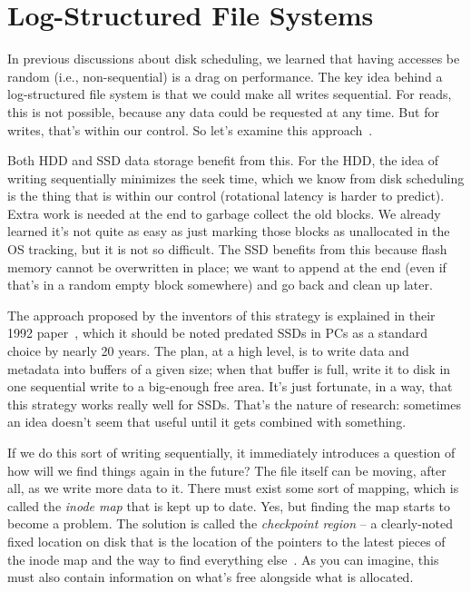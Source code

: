 




\section*{Log-Structured File Systems}
In previous discussions about disk scheduling, we learned that having accesses be random (i.e., non-sequential) is a drag on performance. The key idea behind a log-structured file system is that we could make all writes sequential. For reads, this is not possible, because any data could be requested at any time. But for writes, that's within our control. So let's examine this approach~\cite{OSTEP}.

Both HDD and SSD data storage benefit from this. For the HDD, the idea of writing sequentially minimizes the seek time, which we know from disk scheduling is the thing that is within our control (rotational latency is harder to predict). Extra work is needed at the end to garbage collect the old blocks. We already learned it's not quite as easy as just marking those blocks as unallocated in the OS tracking, but it is not so difficult. The SSD benefits from this because flash memory cannot be overwritten in place; we want to append at the end (even if that's in a random empty block somewhere) and go back and clean up later.

The approach proposed by the inventors of this strategy is explained in their 1992 paper~\cite{log-structured}, which it should be noted predated SSDs in PCs as a standard choice by nearly 20 years. The plan, at a high level, is to write data and metadata into buffers of a given size; when that buffer is full, write it to disk in one sequential write to a big-enough free area. It's just fortunate, in a way, that this strategy works really well for SSDs. That's the nature of research: sometimes an idea doesn't seem that useful until it gets combined with something. 

If we do this sort of writing sequentially, it immediately introduces a question of how will we find things again in the future? The file itself can be moving, after all, as we write more data to it. There must exist some sort of mapping, which is called the \textit{inode map} that is kept up to date. Yes, but finding the map starts to become a problem. The solution is called the \textit{checkpoint region} -- a clearly-noted fixed location on disk that is the location of the pointers to the latest pieces of the inode map and the way to find everything else~\cite{OSTEP}. As you can imagine, this must also contain information on what's free alongside what is allocated.

